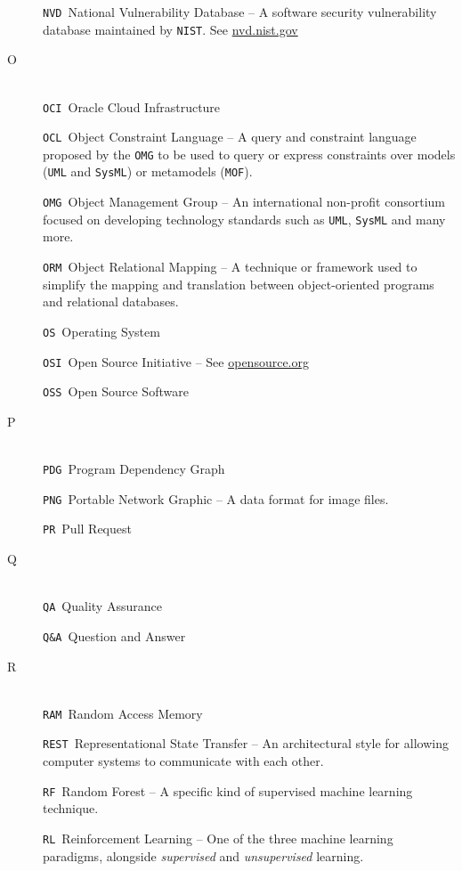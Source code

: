 \begin{description}
\verb|NVD|\quad~National Vulnerability Database -- A software security vulnerability database maintained by \verb|NIST|. See \url{nvd.nist.gov}

\item[O]~\\
\verb|OCI|\quad~Oracle Cloud Infrastructure

\verb|OCL|\quad~Object Constraint Language -- A query and constraint language proposed by the \verb|OMG| to be used to query or express constraints over models (\eg \verb|UML| and \verb|SysML|) or metamodels (\eg \verb|MOF|).

\verb|OMG|\quad~Object Management Group -- An international non-profit consortium focused on developing technology standards such as \verb|UML|, \verb|SysML| and many more.

\verb|ORM|\quad~Object Relational Mapping -- A technique or framework used to simplify the mapping and translation between object-oriented programs and relational databases.

\verb|OS|\quad~Operating System

\verb|OSI|\quad~Open Source Initiative -- See \url{opensource.org}

\verb|OSS|\quad~Open Source Software


\item[P]~\\
\verb|PDG|\quad~Program Dependency Graph

\verb|PNG|\quad~Portable Network Graphic -- A data format for image files.

\verb|PR|\quad~Pull Request


\item[Q]~\\
\verb|QA|\quad~Quality Assurance

\verb|Q&A|\quad~Question and Answer


\item[R]~\\
\verb|RAM|\quad~Random Access Memory

\verb|REST|\quad~Representational State Transfer -- An architectural style for allowing computer systems to communicate with each other.

\verb|RF|\quad~Random Forest -- A specific kind of  supervised machine learning %
technique.

\verb|RL|\quad~Reinforcement Learning -- One of the three machine learning paradigms, alongside \emph{supervised} and \emph{unsupervised} learning.


\end{description}
